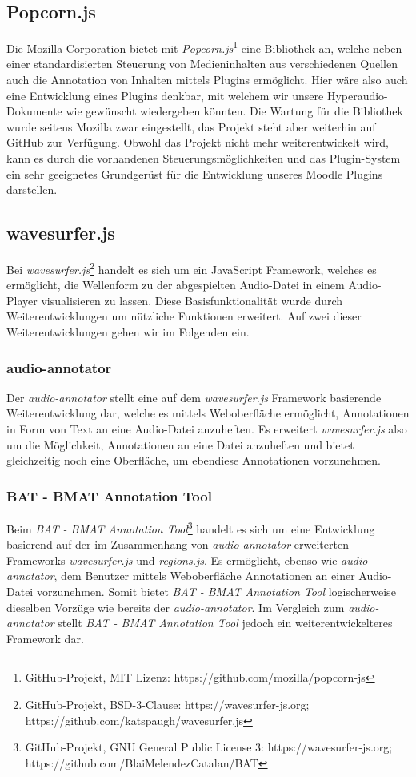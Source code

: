 \subsection{Popcorn.js}
Die Mozilla Corporation bietet mit \textit{Popcorn.js}\footnote{GitHub-Projekt, MIT Lizenz: https://github.com/mozilla/popcorn-js} eine Bibliothek an, welche neben einer standardisierten Steuerung von Medieninhalten aus verschiedenen Quellen auch die Annotation von Inhalten mittels Plugins ermöglicht. Hier wäre also auch eine Entwicklung eines Plugins denkbar, mit welchem wir unsere Hyperaudio-Dokumente wie gewünscht wiedergeben könnten. Die Wartung für die Bibliothek wurde seitens Mozilla zwar eingestellt, das Projekt steht aber weiterhin auf GitHub zur Verfügung. Obwohl das Projekt nicht mehr weiterentwickelt wird, kann es durch die vorhandenen Steuerungsmöglichkeiten und das Plugin-System ein sehr geeignetes Grundgerüst für die Entwicklung unseres Moodle Plugins darstellen.
 
\subsection{wavesurfer.js}
\label{sec:wavesurfer.js}
Bei \textit{wavesurfer.js}\footnote{GitHub-Projekt, BSD-3-Clause: https://wavesurfer-js.org; https://github.com/katspaugh/wavesurfer.js} handelt es sich um ein JavaScript Framework, welches es ermöglicht, die Wellenform zu der abgespielten Audio-Datei in einem Audio-Player visualisieren zu lassen. Diese Basisfunktionalität wurde durch Weiterentwicklungen um nützliche Funktionen erweitert. Auf zwei dieser Weiterentwicklungen gehen wir im Folgenden ein.

\subsubsection{audio-annotator}
Der \textit{audio-annotator} stellt eine auf dem \textit{wavesurfer.js} Framework basierende Weiterentwicklung dar, welche es mittels Weboberfläche ermöglicht, Annotationen in Form von Text an eine Audio-Datei anzuheften. Es erweitert \textit{wavesurfer.js} also um die Möglichkeit, Annotationen an eine Datei anzuheften und bietet gleichzeitig noch eine Oberfläche, um ebendiese Annotationen vorzunehmen.

\subsubsection{BAT - BMAT Annotation Tool}
Beim \textit{BAT - BMAT Annotation Tool}\footnote{GitHub-Projekt, GNU General Public License 3: https://wavesurfer-js.org; https://github.com/BlaiMelendezCatalan/BAT} handelt es sich um eine Entwicklung basierend auf der im Zusammenhang von \textit{audio-annotator} erweiterten Frameworks \textit{wavesurfer.js} und \textit{regions.js}. Es ermöglicht, ebenso wie \textit{audio-annotator}, dem Benutzer mittels Weboberfläche Annotationen an einer Audio-Datei vorzunehmen. Somit bietet \textit{BAT - BMAT Annotation Tool} logischerweise dieselben Vorzüge wie bereits der \textit{audio-annotator}. Im Vergleich zum \textit{audio-annotator} stellt \textit{BAT - BMAT Annotation Tool} jedoch ein weiterentwickelteres Framework dar.

